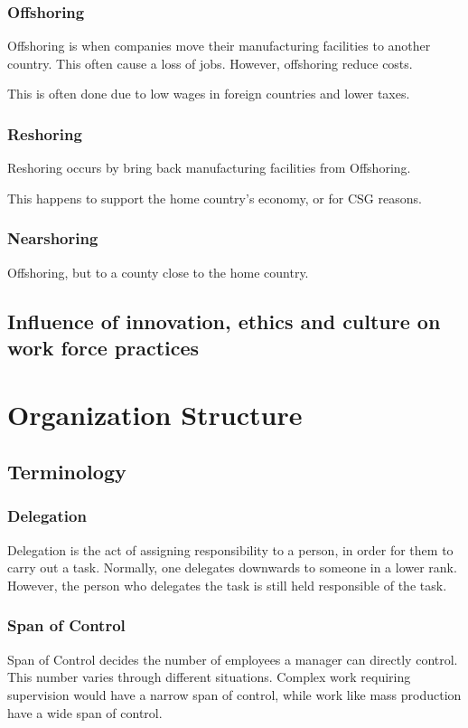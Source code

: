 \documentclass{standalone}
\begin{document}
\subsubsection{Offshoring}
Offshoring is when companies move their manufacturing facilities to another country.
This often cause a loss of jobs.  
However, offshoring reduce costs.

This is often done due to low wages in foreign countries and lower taxes.

\subsubsection{Reshoring}
Reshoring occurs by bring back manufacturing facilities from Offshoring.

This happens to support the home country's economy, or for CSG reasons.

\subsubsection{Nearshoring}
Offshoring, but to a county close to the home country.

\subsection{Influence of innovation, ethics and culture on work force practices}

\section{Organization Structure}

\subsection{Terminology}
\subsubsection{Delegation}
Delegation is the act of assigning responsibility to a person, in order for them to carry out a task.
Normally, one delegates downwards to someone in a lower rank.
However, the person who delegates the task is still held responsible of the task.

\subsubsection{Span of Control}
Span of Control decides the number of employees a manager can directly control.
This number varies through different situations.
Complex work requiring supervision would have a narrow span of control, while work like mass production have a wide span of control.
\end{document}
